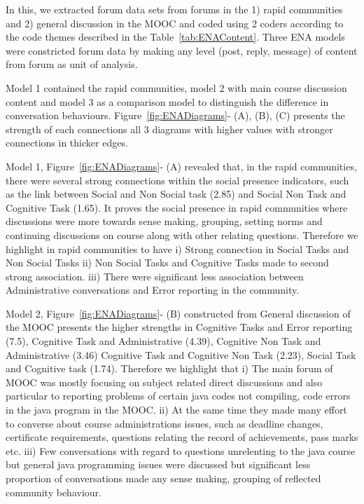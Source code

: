 \documentclass[manuscript,screen,review]{acmart}
\begin{document}
In this, we extracted forum data sets from forums in the 1) rapid communities and 2) general discussion in the MOOC and coded using 2 coders according to the code themes described in the Table~\ref{tab:ENAContent}. Three ENA models were constricted forum data by making any level (post, reply, message) of content from forum as unit of analysis.

Model 1 contained the rapid communities, model 2 with main course discussion content and model 3 as a comparison model to distinguish the difference in conversation behaviours.  Figure~\ref{fig:ENADiagrams}- (A), (B), (C) presents the strength of each connections all 3 diagrams with higher values with stronger connections in thicker edges. 

Model 1, Figure~\ref{fig:ENADiagrams}- (A) revealed that, in the rapid communities, there were several strong connections within the social presence indicators, such as the link between Social and Non Social task (2.85) and Social Non Task and Cognitive Task (1.65). It proves the social presence in rapid communities where discussions were more towards sense making, grouping, setting norms and continuing discussions on course along with other relating questions. Therefore we highlight in rapid communities to have i) Strong connection in Social Tasks and Non Social Tasks ii) Non Social Tasks and Cognitive Tasks made to second strong association. iii) There were significant less association between Administrative conversations and Error reporting in the community. 

Model 2, Figure~\ref{fig:ENADiagrams}- (B) constructed from General discussion of the MOOC presents the higher strengths in Cognitive Tasks and Error reporting (7.5), Cognitive Task and Administrative (4.39), Cognitive Non Task and Administrative (3.46) Cognitive Task and Cognitive Non Task (2.23), Social Task and Cognitive task (1.74). Therefore we highlight that  i) The main forum of MOOC was mostly focusing on subject related direct discussions and also particular to reporting problems of certain java codes not compiling, code errors in the java program in the MOOC. ii) At the same time they made many effort to converse about course administrations issues, such as deadline changes, certificate requirements, questions relating the record of achievements, pass marks etc. iii) Few conversations with regard to questions unrelenting to the java course but general java programming issues were discussed but significant less proportion of conversations made any sense making, grouping of reflected community behaviour. 
\end{document}
